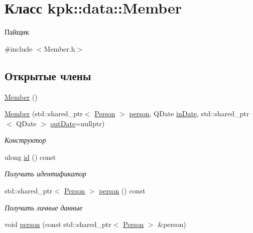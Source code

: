 \hypertarget{classkpk_1_1data_1_1_member}{}\section{Класс kpk\+:\+:data\+:\+:Member}
\label{classkpk_1_1data_1_1_member}


Пайщик  




{\ttfamily \#include $<$Member.\+h$>$}

\subsection*{Открытые члены}
\begin{DoxyCompactItemize}
\item 
\hyperlink{classkpk_1_1data_1_1_member_a956b11ac722db41cc8faba6132cf0575}{Member} ()
\item 
\hyperlink{classkpk_1_1data_1_1_member_ade76bf5afe047083dfc3add3fd50a864}{Member} (std\+::shared\+\_\+ptr$<$ \hyperlink{classkpk_1_1data_1_1_person}{Person} $>$ \hyperlink{classkpk_1_1data_1_1_member_a0a7779da240a4e4ffd04466a1d503dff}{person}, Q\+Date \hyperlink{classkpk_1_1data_1_1_member_a94ae4a3def291913ce30f0e56f5211b3}{in\+Date}, std\+::shared\+\_\+ptr$<$ Q\+Date $>$ \hyperlink{classkpk_1_1data_1_1_member_aed8afbda021f8db04a63b685fe365470}{out\+Date}=nullptr)
\begin{DoxyCompactList}\small\item\em Конструктор \end{DoxyCompactList}\item 
ulong \hyperlink{classkpk_1_1data_1_1_member_a374daa48edaf5fedb31c96edfd87f931}{id} () const 
\begin{DoxyCompactList}\small\item\em Получить идентификатор \end{DoxyCompactList}\item 
std\+::shared\+\_\+ptr$<$ \hyperlink{classkpk_1_1data_1_1_person}{Person} $>$ \hyperlink{classkpk_1_1data_1_1_member_a0a7779da240a4e4ffd04466a1d503dff}{person} () const 
\begin{DoxyCompactList}\small\item\em Получить личные данные \end{DoxyCompactList}\item 
void \hyperlink{classkpk_1_1data_1_1_member_a7b18cdcef35e7c8f3235295ed7a82dc0}{person} (const std\+::shared\+\_\+ptr$<$ \hyperlink{classkpk_1_1data_1_1_person}{Person} $>$ \&person)

\end{DoxyCompactItemize}
